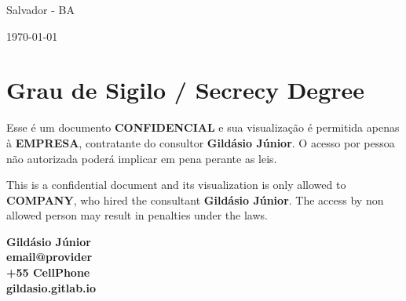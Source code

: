 \documentclass[12pt, oneside]{book}
\begin{document}
\begin{titlepage}
    \vspace{2cm}
    
	{\normalsize Salvador - BA\par}
	
	{\normalsize \today \par}
	\vspace{2cm}
	
	\pagebreak

\end{titlepage}

\newpage

\chapter{Grau de Sigilo / Secrecy Degree}

Esse é um documento \textbf{CONFIDENCIAL} e sua visualização é permitida apenas
à \textbf{EMPRESA}, contratante do consultor \textbf{Gildásio Júnior}. O acesso
por pessoa não autorizada poderá implicar em pena perante as leis.

This is a confidential document and its visualization is only allowed to
\textbf{COMPANY}, who hired the consultant \textbf{Gildásio Júnior}. The access
by non allowed person may result in penalties under the laws.

\newpage

\tableofcontents{}
\clearpage
\mainmatter







\newpage
\vspace*{\fill}
\color{white}
\begin{flushright}
    \textbf{
        Gildásio Júnior \\
        email@provider \\
        +55 CellPhone \\
        gildasio.gitlab.io
    }
\end{flushright}
\end{document}
